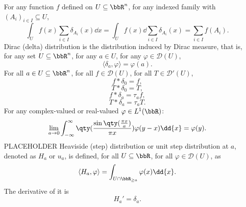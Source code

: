\documentclass[a4paper,12pt]{report}
\begin{document}
For any function $f$ defined on $U\subseteq\bbR^n$, for any indexed family with $(A_i)_{i\in I}\subseteq U$,
\[\int_Uf(x)\sum_{i\in I}\delta_{A_i}(x)\dd{x}=\int_Uf(x)\dd{\sum_{i\in I}\delta_{A_i}(x)}=\sum_{i\in I}f(A_i).\]
Dirac (delta) distribution is the distribution induced by Dirac measure, that is, for any set $U\subseteq\bbR^n$, for any $a\in U$, for any $\varphi\in\mathcal{D}(U)$,
\[\langle\delta_a,\varphi\rangle=\varphi(a).\]
For all $a\in U\subseteq\bbR^n$, for all $f\in\mathcal{D}(U)$, for all $T\in\mathcal{D}'(U)$,
\[f*\delta_0=f,\]
\[T*\delta_0=T,\]
\[f*\delta_a=\tau_af,\]
\[T*\delta_a=\tau_aT.\]
For any complex-valued or real-valued $\varphi\in L^1(\bbR)$:
\[\lim_{a\to 0}\int_{-\infty}^{\infty}\qty(\frac{\sin\qty(\frac{\pi x}{a})}{\pi x})\varphi(y-x)\dd{x}=\varphi(y).\]
\bpr
PLACEHOLDER
\epr
{}
Heaviside (step) distribution or unit step distribution at $a$, denoted as $H_a$ or $u_a$, is defined, for all $U\subseteq\bbR$, for all $\varphi\in\mathcal{D}(U)$, as
\[\langle H_a,\varphi\rangle=\int_{U\cap\bbR_{\geq a}}\varphi(x)\dd{x}.\]
The derivative of it is
\[H_a'=\delta_a.\]
\end{document}

